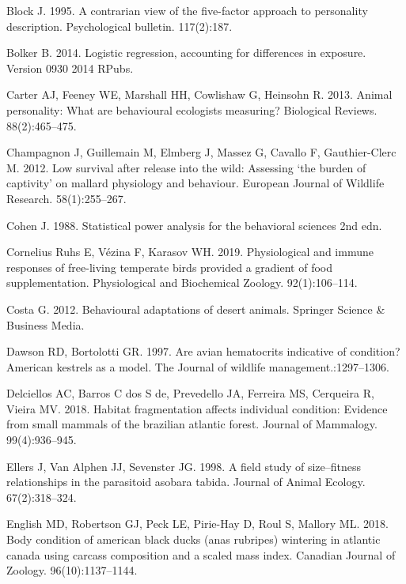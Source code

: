 \documentclass[
]{article}
\begin{document}
\leavevmode\hypertarget{ref-block1995contrarian}{}%
Block J. 1995. A contrarian view of the five-factor approach to
personality description. Psychological bulletin. 117(2):187.

\leavevmode\hypertarget{ref-bolker2014logistic}{}%
Bolker B. 2014. Logistic regression, accounting for differences in
exposure. Version 0930 2014 RPubs.

\leavevmode\hypertarget{ref-carter2013animal}{}%
Carter AJ, Feeney WE, Marshall HH, Cowlishaw G, Heinsohn R. 2013. Animal
personality: What are behavioural ecologists measuring? Biological
Reviews. 88(2):465--475.

\leavevmode\hypertarget{ref-champagnon2012low}{}%
Champagnon J, Guillemain M, Elmberg J, Massez G, Cavallo F,
Gauthier-Clerc M. 2012. Low survival after release into the wild:
Assessing `the burden of captivity' on mallard physiology and behaviour.
European Journal of Wildlife Research. 58(1):255--267.

\leavevmode\hypertarget{ref-cohen1988statistical}{}%
Cohen J. 1988. Statistical power analysis for the behavioral sciences
2nd edn.

\leavevmode\hypertarget{ref-cornelius2019physiological}{}%
Cornelius Ruhs E, Vézina F, Karasov WH. 2019. Physiological and immune
responses of free-living temperate birds provided a gradient of food
supplementation. Physiological and Biochemical Zoology. 92(1):106--114.

\leavevmode\hypertarget{ref-costa2012behavioural}{}%
Costa G. 2012. Behavioural adaptations of desert animals. Springer
Science \& Business Media.

\leavevmode\hypertarget{ref-dawson1997avian}{}%
Dawson RD, Bortolotti GR. 1997. Are avian hematocrits indicative of
condition? American kestrels as a model. The Journal of wildlife
management.:1297--1306.

\leavevmode\hypertarget{ref-delciellos2018habitat}{}%
Delciellos AC, Barros C dos S de, Prevedello JA, Ferreira MS, Cerqueira
R, Vieira MV. 2018. Habitat fragmentation affects individual condition:
Evidence from small mammals of the brazilian atlantic forest. Journal of
Mammalogy. 99(4):936--945.

\leavevmode\hypertarget{ref-ellers1998field}{}%
Ellers J, Van Alphen JJ, Sevenster JG. 1998. A field study of
size--fitness relationships in the parasitoid asobara tabida. Journal of
Animal Ecology. 67(2):318--324.

\leavevmode\hypertarget{ref-english2018body}{}%
English MD, Robertson GJ, Peck LE, Pirie-Hay D, Roul S, Mallory ML.
2018. Body condition of american black ducks (anas rubripes) wintering
in atlantic canada using carcass composition and a scaled mass index.
Canadian Journal of Zoology. 96(10):1137--1144.
\end{document}
